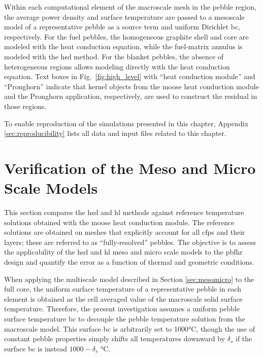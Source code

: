 Within each computational element of the macroscale mesh in the pebble region, the average power density and surface temperature are passed to a mesoscale model of a representative pebble as a source term and uniform Dirichlet \gls{bc}, respectively. For the fuel pebbles, the homogeneous graphite shell and core are modeled with the heat conduction equation, while the fuel-matrix annulus is modeled with the \gls{hsd} method. For the blanket pebbles, the absence of heterogeneous regions allows modeling directly with the heat conduction equation. Text boxes in Fig.\ \ref{fig:high_level} with ``heat conduction module'' and ``Pronghorn'' indicate that kernel objects from the \gls{moose} heat conduction module and the Pronghorn application, respectively, are used to construct the residual in those regions.

To enable reproduction of the simulations presented in this chapter, Appendix \ref{sec:reproducibility} lists all data and input files related to this chapter.

\section{Verification of the Meso and Micro Scale Models}
\label{sec:meso_fhr}

This section compares the \gls{hsd} and \gls{hl} methods against reference temperature solutions obtained with the \gls{moose} heat conduction module. The reference solutions are obtained on meshes that explicitly account for all \glspl{cfp} and their layers; these are referred to as ``fully-resolved'' pebbles. The objective is to assess the applicability of the \gls{hsd} and \gls{hl} meso and micro scale models to the \gls{pbfhr} design and quantify the error as a function of thermal and geometric conditions.

When applying the multiscale model described in Section \ref{sec:mesomicro} to the full core, the uniform surface temperature of a representative pebble in each element is obtained as the cell averaged value of the macroscale solid surface temperature. Therefore, the present investigation assumes a uniform pebble surface temperature \gls{bc} to decouple the pebble temperature solution from the macroscale model. This surface \gls{bc} is arbitrarily set to 1000\si{\celsius}, though the use of constant pebble properties simply shifts all temperatures downward by \(\delta_s\) if the surface \gls{bc} is instead \(1000-\delta_s\) \si{\celsius}.

